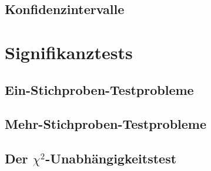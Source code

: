 \subsection{Konfidenzintervalle}
\section{Signifikanztests}
\subsection{Ein-Stichproben-Testprobleme}
\subsection{Mehr-Stichproben-Testprobleme}
\subsection{Der $\chi^2$-Unabhängigkeitstest}